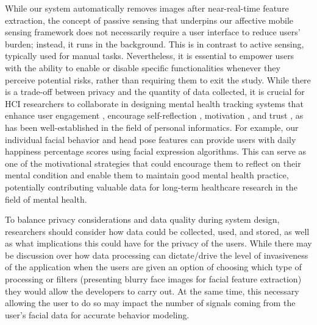While our system automatically removes images after near-real-time feature extraction, the concept of passive sensing \cite{denning2014situ} that underpins our affective mobile sensing framework does not necessarily require a user interface to reduce users' burden; instead, it runs in the background. This is in contrast to active sensing, typically used for manual tasks. Nevertheless, it is essential to empower users with the ability to enable or disable specific functionalities whenever they perceive potential risks, rather than requiring them to exit the study. While there is a trade-off between privacy and the quantity of data collected, it is crucial for HCI researchers to collaborate in designing mental health tracking systems that enhance user engagement \cite{o2008user}, encourage self-reflection \cite{li2010stage}, motivation \cite{consolvo2006design}, and trust \cite{kelley2009nutrition}, as has been well-established in the field of personal informatics. For example, our individual facial behavior and head pose features can provide users with daily happiness percentage scores using facial expression algorithms. This can serve as one of the motivational strategies that could encourage them to reflect on their mental condition and enable them to maintain good mental health practice, potentially contributing valuable data for long-term healthcare research in the field of mental health. 

To balance privacy considerations and data quality during system design, researchers should consider how data could be collected, used, and stored, as well as what implications this could have for the privacy of the users. While there may be discussion over how data processing can dictate/drive the level of invasiveness of the application when the users are given an option of choosing which type of processing or filters (presenting blurry face images for facial feature extraction) \cite{denning2014situ} they would allow the developers to carry out. At the same time, this necessary allowing the user to do so may impact the number of signals coming from the user's facial data for accurate behavior modeling. 


